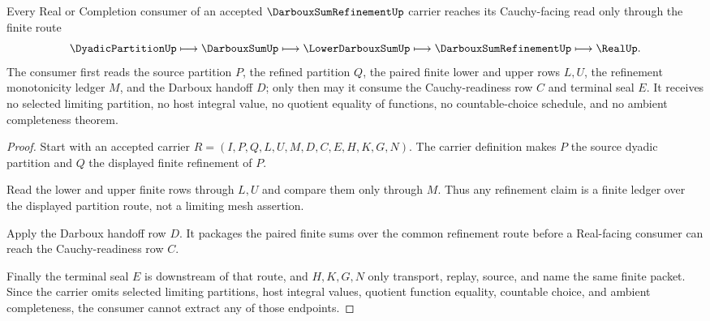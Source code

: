 \begin{theorem}
\label{thm:darboux-sum-refinement-cauchy-handoff}
Every Real or Completion consumer of an accepted $\DarbouxSumRefinementUp$ carrier reaches its Cauchy-facing read only through the finite route
$$
\DyadicPartitionUp \longmapsto \DarbouxSumUp \longmapsto \LowerDarbouxSumUp \longmapsto \DarbouxSumRefinementUp \longmapsto \RealUp .
$$
The consumer first reads the source partition $P$, the refined partition $Q$, the paired finite lower and upper rows $L,U$, the refinement monotonicity ledger $M$, and the Darboux handoff $D$; only then may it consume the Cauchy-readiness row $C$ and terminal seal $E$. It receives no selected limiting partition, no host integral value, no quotient equality of functions, no countable-choice schedule, and no ambient completeness theorem.
\end{theorem}
\begin{proof}
Start with an accepted carrier $R=(I,P,Q,L,U,M,D,C,E,H,K,G,N)$. The carrier definition makes $P$ the source dyadic partition and $Q$ the displayed finite refinement of $P$.

Read the lower and upper finite rows through $L,U$ and compare them only through $M$. Thus any refinement claim is a finite ledger over the displayed partition route, not a limiting mesh assertion.

Apply the Darboux handoff row $D$. It packages the paired finite sums over the common refinement route before a Real-facing consumer can reach the Cauchy-readiness row $C$.

Finally the terminal seal $E$ is downstream of that route, and $H,K,G,N$ only transport, replay, source, and name the same finite packet. Since the carrier omits selected limiting partitions, host integral values, quotient function equality, countable choice, and ambient completeness, the consumer cannot extract any of those endpoints.
\end{proof}


